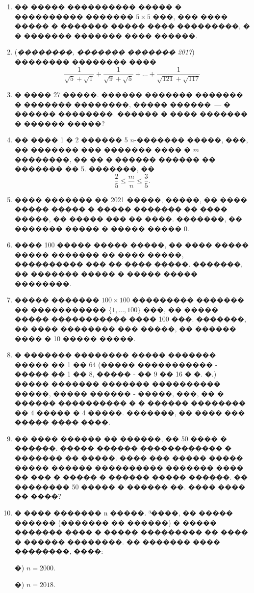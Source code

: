\documentclass[a4paper,12pt]{article}
\begin{document}
\begin{enumerate}
\item �� ����� ���������� ����� � ���������� ������� $5\times 5$ ���, ��� ���� ����� � ������� ����� ���� ���������, � � ������� ������� ���� ������.

\item (\textit{��������, ������� ������� 2017}) �������� �������� ���� $$\frac{1}{\sqrt{5}+\sqrt{1}}+\frac{1}{\sqrt{9}+\sqrt{5}}+...+\frac{1}{\sqrt{121}+\sqrt{117}}$$

\item  � ���� 27 �����. ������ ������� ������� � ������� ��������, ����� ������~--- � ������ ��������. ������ � ���� ������� � ������ �����?

\item �� ���� 1 � 2 ������ 5 $n$-������� �����, ���, �� ������� ��� ������� ���� � $m$ ��������, �� �� � ������ ������ �� ������� �� 5. �������, �� $$\frac{2}{5}\leq\frac{m}{n}\leq\frac{3}{5}.$$

\item ���� ������� �� 2021 �����, �����, �� ���� ����� ����� � ����� ������� �� ���� �����, �� ����� ��� �� ����. �������, �� ������� ����� � ����� ����� 0.

\item ���� 100 ����� ����� �����, �� ���� ����� ����� ������� �� ���� �����, ���������� ��� �� ���� �����. �������, �� ������� ����� � ����� ����� ��������.

\item ����� ������� $100\times 100$ ��������� ������� �� ����������� $\{1,...,100\}$ ���, �� ����� ����� ����������� ���� 100 ���. �������, �� ���� �������� ��� �����, �� ������ ���� � 10 ����� �����.

\item � ������� �������� ����� ������� ����� �� 1 �� 64 (����� ����������� - ����� �� 1 �� 8, ����� - �� 9 �� 16 � �. �.) ����� ������� ������� ���������� �����, ����� ������ - �����, ���, �� � ������ ���������� � � ������ �������� �� 4 ����� � 4 �����. �������, �� ���� ��� ����� ���� ����.

\item �� ���� ������ �� ������, �� 50 ���� � ������. ����� ������ ������������ � ������� �� �����. ���� ��� ����� ����� ����� ������ ���������� ������� ���� �� ��� � ����� � ������ ����� ������. �� �������� 50 ����� � ������ ��. ���� ���� �� ����?

\item � ���� ������� n �����. ³����, �� ����� ������ (������� �� ������) � ����� ������� ���� � ����� ��������� �� ���� � ������ ��������. �� ������� ���� ��������, ����:

�) $n=2000$.

�) $n=2018$.
\end{enumerate}
\end{document}
